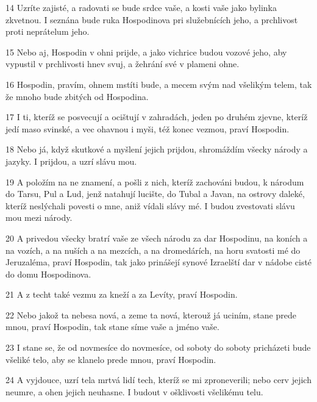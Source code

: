 \par 14 Uzríte zajisté, a radovati se bude srdce vaše, a kosti vaše jako bylinka zkvetnou. I seznána bude ruka Hospodinova pri služebnících jeho, a prchlivost proti neprátelum jeho.
\par 15 Nebo aj, Hospodin v ohni prijde, a jako vichrice budou vozové jeho, aby vypustil v prchlivosti hnev svuj, a žehrání své v plameni ohne.
\par 16 Hospodin, pravím, ohnem mstíti bude, a mecem svým nad všelikým telem, tak že mnoho bude zbitých od Hospodina.
\par 17 I ti, kteríž se posvecují a ocištují v zahradách, jeden po druhém zjevne, kteríž jedí maso svinské, a vec ohavnou i myši, též konec vezmou, praví Hospodin.
\par 18 Nebo já, když skutkové a myšlení jejich prijdou, shromáždím všecky národy a jazyky. I prijdou, a uzrí slávu mou.
\par 19 A položím na ne znamení, a pošli z nich, kteríž zachováni budou, k národum do Tarsu, Pul a Lud, jenž natahují lucište, do Tubal a Javan, na ostrovy daleké, kteríž neslýchali povesti o mne, aniž vídali slávy mé. I budou zvestovati slávu mou mezi národy.
\par 20 A privedou všecky bratrí vaše ze všech národu za dar Hospodinu, na koních a na vozích, a na nuších a na mezcích, a na dromedárích, na horu svatosti mé do Jeruzaléma, praví Hospodin, tak jako prinášejí synové Izraelští dar v nádobe cisté do domu Hospodinova.
\par 21 A z techt také vezmu za kneží a za Levíty, praví Hospodin.
\par 22 Nebo jakož ta nebesa nová, a zeme ta nová, kterouž já uciním, stane prede mnou, praví Hospodin, tak stane síme vaše a jméno vaše.
\par 23 I stane se, že od novmesíce do novmesíce, od soboty do soboty pricházeti bude všeliké telo, aby se klanelo prede mnou, praví Hospodin.
\par 24 A vyjdouce, uzrí tela mrtvá lidí tech, kteríž se mi zproneverili; nebo cerv jejich neumre, a ohen jejich neuhasne. I budout v ošklivosti všelikému telu.

